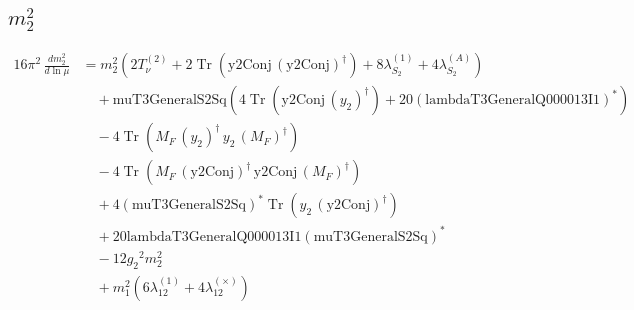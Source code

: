 \documentclass[10pt,a4paper]{article}
\begin{document}
\subsection*{$m_2^2$}
\begin{align*}
16\pi^2\,\frac{d m_2^2}{d\ln\mu} &={m_2^2} (2 T_{\nu}^{(2)}+2 \operatorname{Tr}\!\left(\text{y2Conj}\,\left(\text{y2Conj}\right)^{\dagger}\right)+8 {\lambda_{S_2}^{(1)}}+4 {\lambda_{S_2}^{(A)}}) \\
&\quad +\text{muT3GeneralS2Sq} (4 \operatorname{Tr}\!\left(\text{y2Conj}\,\left({y_2}\right)^{\dagger}\right)+20 \left(\text{lambdaT3GeneralQ000013I1}\right)^{*}) \\
&\quad -4 \operatorname{Tr}\!\left({M_F}\,\left({y_2}\right)^{\dagger}\,{y_2}\,\left({M_F}\right)^{\dagger}\right) \\
&\quad -4 \operatorname{Tr}\!\left({M_F}\,\left(\text{y2Conj}\right)^{\dagger}\,\text{y2Conj}\,\left({M_F}\right)^{\dagger}\right) \\
&\quad +4 \left(\text{muT3GeneralS2Sq}\right)^{*} \operatorname{Tr}\!\left({y_2}\,\left(\text{y2Conj}\right)^{\dagger}\right) \\
&\quad +20 \text{lambdaT3GeneralQ000013I1} \left(\text{muT3GeneralS2Sq}\right)^{*} \\
&\quad -12 {g_2}^2 {m_2^2} \\
&\quad +{m_1^2} (6 {\lambda_{12}^{(1)}}+4 {\lambda_{12}^{(\times)}}) \\
\end{align*}
\end{document}
